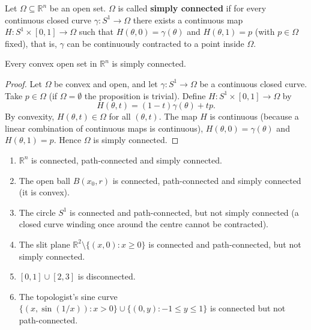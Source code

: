 \begin{definition}\label{def:simply_connected}
Let $\Omega \subseteq \mathbb{R}^n$ be an open set. $\Omega$ is called \textbf{simply connected} if for every continuous closed curve $\gamma: S^1 \to \Omega$ there exists a continuous map $H: S^1 \times [0, 1] \to \Omega$ such that $H(\theta, 0) = \gamma(\theta)$ and $H(\theta, 1) = p$ (with $p \in \Omega$ fixed), that is, $\gamma$ can be continuously contracted to a point inside $\Omega$.
\end{definition}

\begin{proposition}\label{prop:convex_simply_connected}
Every convex open set in $\mathbb{R}^n$ is simply connected.
\end{proposition}

\begin{proof}
Let $\Omega$ be convex and open, and let $\gamma: S^1 \to \Omega$ be a continuous closed curve. Take $p \in \Omega$ (if $\Omega = \emptyset$ the proposition is trivial). Define $H: S^1 \times [0, 1] \to \Omega$ by
\[
H(\theta, t) = (1 - t) \gamma(\theta) + t p.
\]
By convexity, $H(\theta, t) \in \Omega$ for all $(\theta, t)$. The map $H$ is continuous (because a linear combination of continuous maps is continuous), $H(\theta, 0) = \gamma(\theta)$ and $H(\theta, 1) = p$. Hence $\Omega$ is simply connected.
\end{proof}

\begin{example}\label{ex:connected_examples}
\begin{enumerate}[label=(\roman*)]
    \item $\mathbb{R}^n$ is connected, path-connected and simply connected.
    \item The open ball $B(x_0, r)$ is connected, path-connected and simply connected (it is convex).
    \item The circle $S^1$ is connected and path-connected, but not simply connected (a closed curve winding once around the centre cannot be contracted).
    \item The slit plane $\mathbb{R}^2 \setminus \{(x, 0) : x \geq 0\}$ is connected and path-connected, but not simply connected.
    \item $[0, 1] \cup [2, 3]$ is disconnected.
    \item The topologist's sine curve $\{(x, \sin(1/x)) : x > 0\} \cup \{(0, y) : -1 \le y \le 1\}$ is connected but not path-connected.
\end{enumerate}
\end{example}

